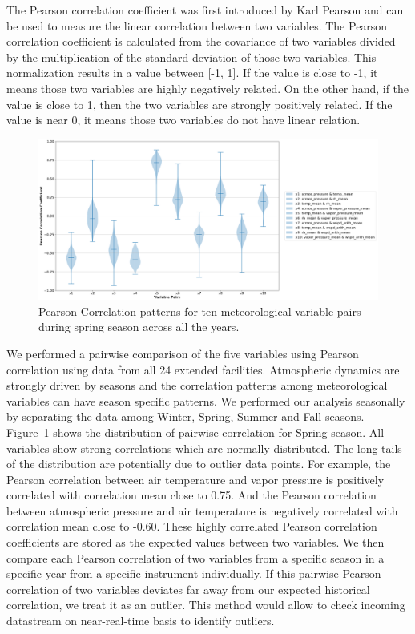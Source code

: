 The Pearson correlation coefficient was first introduced by Karl
Pearson\cite{pearson1895note} and can be used to measure the linear
correlation between two variables. The Pearson correlation coefficient
is calculated from the covariance of two variables divided by the
multiplication of the standard deviation of those two variables. This
normalization results in a value between [-1, 1]. If the value is close
to -1, it means those two variables are highly negatively related. On
the other hand, if the value is close to 1, then the two variables are strongly positively related.
If the value is near 0, it means those two variables do not have linear
relation. 

\begin{figure}[ht]
    \centering
    \includegraphics[width=\textwidth]{figures/Spring.png}
    \caption{Pearson Correlation patterns for ten meteorological variable pairs
		during spring season across all the years.}
    \label{fig:pc}
\end{figure}

We performed a pairwise comparison of the five variables using Pearson
correlation using data from all 24 extended facilities. Atmospheric
dynamics are strongly driven by seasons and the correlation patterns
among meteorological variables can have season specific patterns. We
performed our analysis seasonally by separating the data among Winter, Spring,
Summer and Fall seasons. Figure~\ref{fig:pc} shows the distribution of
pairwise correlation for Spring season. All variables show strong
correlations which are normally distributed. The long tails of the
distribution are potentially due to outlier data points. 
For example, the Pearson correlation between
air temperature and vapor pressure is positively
correlated with correlation mean close to 0.75. And the Pearson
correlation between atmospheric pressure and air temperature is
negatively correlated with correlation mean close to -0.60. These highly
correlated Pearson correlation coefficients are stored as the expected
values between two variables. We then compare each Pearson correlation
of two variables from a specific season in a specific year from a
specific instrument individually. If this pairwise Pearson correlation
of two variables deviates far away from our expected historical
correlation, we treat it as an outlier. This method would allow to check
incoming datastream on near-real-time basis to identify outliers.

